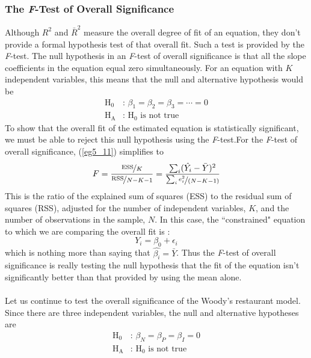 \documentclass[11pt]{article}
\begin{document}
\subsubsection{The \textit{F}-Test of Overall Significance}
Although $R^2$ and $\bar{R}^2$ measure the overall degree of fit of an equation, they don't provide a formal hypothesis test of that overall fit. Such a test is provided by the \textit{F}-test. The null hypothesis in an \textit{F}-test of overall significance is that all the slope coefficients in the equation equal zero simultaneously. For an equation with $K$ independent variables, this means that the null and alternative hypothesis would be
\begin{align*}
\text{H}_0 & \text{: }\beta_1 = \beta_2=\beta_3 = \cdots = 0\\ 
\text{H}_\text{A} & \text{: } \text{H}_0 \text{ is not true}
\end{align*}
To show that the overall fit of the estimated equation is statistically significant, we must be able to reject this null hypothesis using the \textit{F}-test.For the \textit{F}-test of overall significance, (\ref{eg5_11}) simplifies to
\begin{equation}
F = \frac{\nicefrac{\text{ESS}}{K}}{\nicefrac{\text{RSS}}{N-K-1}} = \frac{\sum_i(\hat{Y_i} - \bar{Y})^2}{\nicefrac{\sum_i e_i^2}{(N-K-1)}} \label{eg5_12}
\end{equation}
This is the ratio of the explained sum of squares (ESS) to the residual sum of squares (RSS), adjusted for the number of independent variables, $K$, and the number of observations in the sample, $N$. In this case, the ``constrained" equation to which we are comparing the overall fit is :
\begin{equation}
Y_i = \beta_0 + \epsilon_i \label{eg5_13}
\end{equation}
which is nothing more than saying that $\hat{\beta_i} = \bar{Y}$. Thus the \textit{F}-test of overall significance is really testing the null hypothesis that the fit of the equation isn't significantly better than that provided by using the mean alone.\\ \\
Let us continue to test the overall significance of the Woody's restaurant model. Since there are three independent variables, the null and alternative hypotheses are
\begin{align*}
 \text{H}_0 & \text{: }\beta_N = \beta_P = \beta_I = 0\\ \text{H}_\text{A} & \text{: } \text{H}_0 \text{ is not true}
\end{align*}
\end{document}
